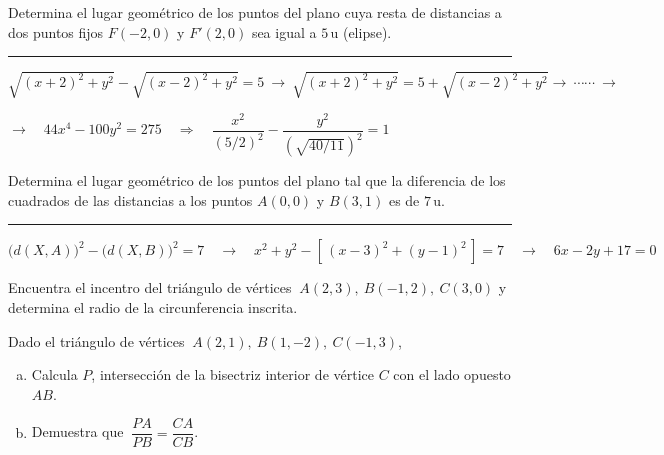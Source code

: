 \begin{miejercicio}

Determina el lugar geométrico de los puntos del plano cuya resta de distancias a dos puntos fijos $F(-2,0)$ y $F'(2,0)$ sea igual a $5\, \mathrm{u}$ (elipse).

\rule{250pt}{0.5pt}

\vspace{2mm} $\sqrt{(x+2)^2+y^2}-\sqrt{(x-2)^2+y^2}=5 \ \to \ 
\sqrt{(x+2)^2+y^2}=5+\sqrt{(x-2)^2+y^2}\to  \  
\cdots \cdots \ \to $

\vspace{2mm} $\to \quad 44x^4-100y^2=275 \quad \Rightarrow \quad \dfrac{x^2}{(5/2)^2}-\dfrac{y^2}{(\sqrt{40/11})^2}=1$
	
\end{miejercicio}

\begin{miejercicio}

Determina el lugar geométrico de los puntos del plano tal que la diferencia de los cuadrados de las distancias a los puntos $A(0,0)$ y $B(3,1)$ es de $7\, \mathrm{u}$.

\rule{250pt}{0.5pt}

\vspace{2mm} $\big(d(X,A)\big)^2-\big(d(X,B)\big)^2=7 \quad \to \quad x^2+y^2-[\, (x-3)^2+(y-1)^2\, ]=7 \quad \to \quad 6x-2y+17=0$
	
\end{miejercicio}

\vspace{1cm}

\begin{mipropuesto}

Encuentra el incentro del triángulo de vértices $\ A(2,3),\ B(-1,2),\ C(3,0)$ y determina el radio de la circunferencia inscrita.	
\end{mipropuesto}

\vspace{-6mm}
\begin{flushright}
\begin{footnotesize} \textcolor{gris}{}	\end{footnotesize}
\end{flushright}

\begin{mipropuesto}

Dado el triángulo de vértices $\ A(2,1),\ B(1,-2),\ C(-1,3)$, 

\begin{enumerate}[a) ]
\item Calcula $P$, intersección de la bisectriz interior de vértice $C$ con el lado opuesto $AB$.
\item Demuestra que $\ \dfrac{PA}{PB}=\dfrac{CA}{CB}$.	
\end{enumerate}
	
\end{mipropuesto}

